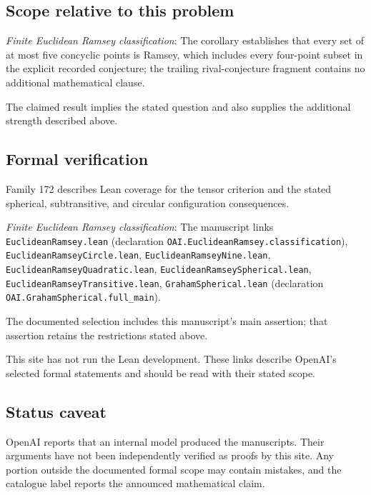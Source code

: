 \documentclass[11pt]{article}
\begin{document}
\subsection{Scope relative to this problem}
\textit{Finite Euclidean Ramsey classification}: The corollary establishes that every set of at most five concyclic points is Ramsey, which includes every four-point subset in the explicit recorded conjecture; the trailing rival-conjecture fragment contains no additional mathematical clause.

The claimed result implies the stated question and also supplies the additional strength described above.

\subsection{Formal verification}
Family 172 describes Lean coverage for the tensor criterion and the stated spherical, subtransitive, and circular configuration consequences.

\textit{Finite Euclidean Ramsey classification}: The manuscript links \texttt{EuclideanRamsey.lean} (declaration \texttt{OAI.EuclideanRamsey.classification}), \texttt{EuclideanRamseyCircle.lean}, \texttt{EuclideanRamseyNine.lean}, \texttt{EuclideanRamseyQuadratic.lean}, \texttt{EuclideanRamseySpherical.lean}, \texttt{EuclideanRamseyTransitive.lean}, \texttt{GrahamSpherical.lean} (declaration \texttt{OAI.GrahamSpherical.full\_main}).

The documented selection includes this manuscript’s main assertion; that assertion retains the restrictions stated above.

This site has not run the Lean development. These links describe OpenAI’s selected formal statements and should be read with their stated scope.

\subsection{Status caveat}
OpenAI reports that an internal model produced the manuscripts. Their arguments have not been independently verified as proofs by this site. Any portion outside the documented formal scope may contain mistakes, and the catalogue label reports the announced mathematical claim.
\end{document}
